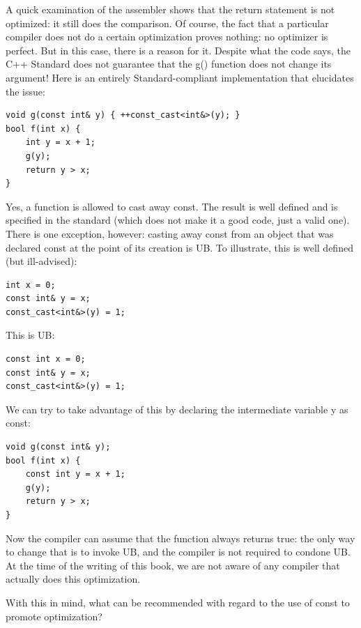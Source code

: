 A quick examination of the assembler shows that the return statement is not optimized: it still does the comparison. Of course, the fact that a particular compiler does not do a certain optimization proves nothing: no optimizer is perfect. But in this case, there is a reason for it. Despite what the code says, the C++ Standard does not guarantee that the g() function does not change its argument! Here is an entirely Standard-compliant  implementation that elucidates the issue:

\begin{lstlisting}[style=styleCXX]
void g(const int& y) { ++const_cast<int&>(y); }
bool f(int x) {
	int y = x + 1;
	g(y);
	return y > x;
}
\end{lstlisting}

Yes, a function is allowed to cast away const. The result is well defined and is specified in the standard (which does not make it a good code, just a valid one). There is one exception, however: casting away const from an object that was declared const at the point of its creation is UB. To illustrate, this is well defined (but ill-advised):

\begin{lstlisting}[style=styleCXX]
int x = 0;
const int& y = x;
const_cast<int&>(y) = 1;
\end{lstlisting}

This is UB:

\begin{lstlisting}[style=styleCXX]
const int x = 0;
const int& y = x;
const_cast<int&>(y) = 1;
\end{lstlisting}

We can try to take advantage of this by declaring the intermediate variable y as const:

\begin{lstlisting}[style=styleCXX]
void g(const int& y);
bool f(int x) {
	const int y = x + 1;
	g(y);
	return y > x;
}
\end{lstlisting}

Now the compiler can assume that the function always returns true: the only way to change that is to invoke UB, and the compiler is not required to condone UB. At the time of the writing of this book, we are not aware of any compiler that actually does this optimization.

With this in mind, what can be recommended with regard to the use of const to promote optimization?

